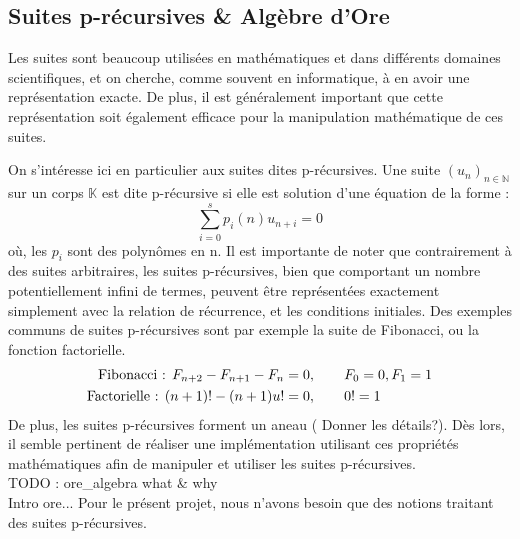 \documentclass[12pt]{article}
\begin{document}
    \subsection{Suites p-récursives \& Algèbre d'Ore}
        \label{ssec:prec}
        \par Les suites sont beaucoup utilisées en mathématiques et dans différents domaines
        scientifiques, et on cherche, comme souvent en informatique, à en avoir une
        représentation exacte. De plus, il est généralement important que cette représentation
        soit également efficace pour la manipulation mathématique de ces suites.
        \par On s'intéresse ici en particulier aux suites dites p-récursives.
        Une suite $(u_n)_{n\in\mathbb N}$ sur un corps $\mathbb K$ est dite p-récursive
        si elle est solution d'une équation de la forme :
        \begin{equation}
            \sum_{i=0}^s p_i(n) u_{n+i} = 0
        \end{equation}
        où, les $p_i$ sont des polynômes en n. Il est importante de noter que contrairement
        à des suites arbitraires, les suites p-récursives, bien que comportant un nombre
        potentiellement infini de termes, peuvent être représentées exactement simplement
        avec la relation de récurrence, et les conditions initiales.
        Des exemples communs de suites p-récursives
        sont par exemple la suite de Fibonacci, ou la fonction factorielle.
        \begin{align*}
            \textnormal{Fibonacci : } F_{n+2} - F_{n+1} - F_n &= 0, \qquad F_0=0, F_1=1\\
            \textnormal{Factorielle : } (n+1)! - (n+1)u! &= 0, \qquad 0!=1
        \end{align*}
        De plus, les suites p-récursives forment un aneau ({\color{red} Donner les détails?}).
        Dès lors, il semble pertinent
        de réaliser une implémentation utilisant ces propriétés mathématiques afin de
        manipuler et utiliser les suites p-récursives.\\
        {\color{red} TODO : ore\_algebra what \& why\\ Intro ore...} Pour le présent projet,
        nous n'avons besoin que des notions traitant des suites p-récursives.
\end{document}
